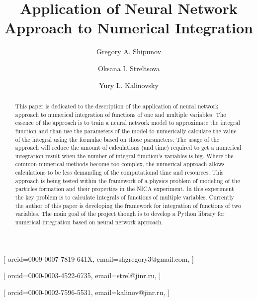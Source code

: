 \documentclass[%
]{ittmm}
\begin{document}


\title{Application of Neural Network Approach to Numerical Integration}

\author[1]{Gregory A. Shipunov}[%
orcid=0009-0007-7819-641X,
email=shgregory3@gmail.com,
]
\cormark[1]

\author[1,2]{Oksana I. Streltsova}[%
orcid=0000-0003-4522-6735,
email=strel@jinr.ru,
]

\author[1,2]{Yury L. Kalinovsky}[%
orcid=0000-0002-7596-5531,
email=kalinov@jinr.ru,
]
\address[1]{Dubna State University,
  19 Universitetskaya St, Dubna, 141980, Russian Federation}
\address[2]{Joint Institute for Nuclear Research,
  6 Joliot-Curie St, Dubna, 141980, Russian Federation}


\begin{abstract}
    This paper is dedicated to the description of the application of neural network approach to numerical integration of functions of one and multiple variables. The essence of the approach is to train a neural network model to approximate the integral function and than use the parameters of the model to numerically calculate the value of the integral using the formulae based on those parameters. The usage of the approach will reduce the amount of calculations (and time) required to get a numerical integration result when the number of integral function's variables is big. Where the common numerical methods become too complex, the numerical approach allows calculations to be less demanding of the computational time and resources. This approach is being tested within the framework of a physics problem of modeling of the particles formation and their properties in the NICA experiment. In this experiment the key problem is to calculate integrals of functions of multiple variables. Currently the author of this paper is developing the framework for integration of functions of two variables. The main goal of the project though is to develop a Python library for numerical integration based on neural network approach.

\end{abstract}
\end{document}
